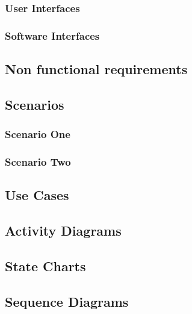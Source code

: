 \documentclass{article}
\begin{document}
\begin{itemize}
\subsubsection{User Interfaces}


\clearpage
\subsubsection{Software Interfaces}


\subsection{Non functional requirements}


\subsection{Scenarios}

\subsubsection{Scenario One}


\clearpage
\subsubsection{Scenario Two}


\clearpage
\subsection{Use Cases}



\clearpage
\subsection{Activity Diagrams}


\clearpage
\subsection{State Charts}


\clearpage
\subsection{Sequence Diagrams}



\end{itemize}
\end{document}
